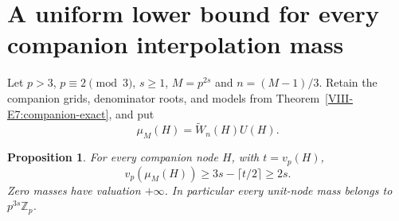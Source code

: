 \documentclass[11pt,letterpaper]{article}
\newtheorem{proposition}[theorem]{Proposition}
\numberwithin{equation}{section}
\begin{document}
\section{A uniform lower bound for every companion interpolation mass}\label{loc-VIII-8}
\label{VIII-sec:E7companionmass}
Let $p>3$, $p\equiv2\pmod3$, $s\ge1$, $M=p^{2s}$ and
$n=(M-1)/3$. Retain the companion grids, denominator roots, and models
from Theorem~\ref{VIII-E7:companion-exact}, and put
\[
 \mu_M(H)=\widetilde W_n(H)U(H).
\]
\begin{proposition}\label{VIII-E7:companion-mass-bound}
For every companion node $H$, with $t=v_p(H)$,
\[
 \boxed{\quad v_p(\mu_M(H))\ge3s-\lceil t/2\rceil\ge2s.\quad}
\]
Zero masses have valuation $+\infty$. In particular every unit-node
mass belongs to $p^{3s}\mathbb Z_p$.
\end{proposition}
\end{document}
